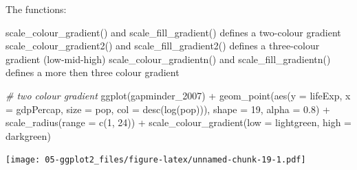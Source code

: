 \documentclass[
]{book}
\newenvironment{Shaded}{\begin{snugshade}}{\end{snugshade}}
\newcommand{\AttributeTok}[1]{\textcolor[rgb]{0.77,0.63,0.00}{#1}}
\newcommand{\CommentTok}[1]{\textcolor[rgb]{0.56,0.35,0.01}{\textit{#1}}}
\newcommand{\DecValTok}[1]{\textcolor[rgb]{0.00,0.00,0.81}{#1}}
\newcommand{\FloatTok}[1]{\textcolor[rgb]{0.00,0.00,0.81}{#1}}
\newcommand{\FunctionTok}[1]{\textcolor[rgb]{0.00,0.00,0.00}{#1}}
\newcommand{\NormalTok}[1]{#1}
\newcommand{\SpecialCharTok}[1]{\textcolor[rgb]{0.00,0.00,0.00}{#1}}
\newcommand{\StringTok}[1]{\textcolor[rgb]{0.31,0.60,0.02}{#1}}
\begin{document}
The functions:

scale\_colour\_gradient() and scale\_fill\_gradient() defines a two-colour gradient
scale\_colour\_gradient2() and scale\_fill\_gradient2() defines a three-colour gradient (low-mid-high)
scale\_colour\_gradientn() and scale\_fill\_gradientn() defines a more then three colour gradient

\begin{Shaded}
\begin{Highlighting}[]
\CommentTok{\# two colour gradient}
\FunctionTok{ggplot}\NormalTok{(gapminder\_2007) }\SpecialCharTok{+} 
  \FunctionTok{geom\_point}\NormalTok{(}\FunctionTok{aes}\NormalTok{(}\AttributeTok{y =}\NormalTok{ lifeExp, }\AttributeTok{x =}\NormalTok{ gdpPercap, }\AttributeTok{size =}\NormalTok{ pop, }\AttributeTok{col =} \FunctionTok{desc}\NormalTok{(}\FunctionTok{log}\NormalTok{(pop))), }
           \AttributeTok{shape =} \DecValTok{19}\NormalTok{, }\AttributeTok{alpha =} \FloatTok{0.8}\NormalTok{) }\SpecialCharTok{+}
  \FunctionTok{scale\_radius}\NormalTok{(}\AttributeTok{range =} \FunctionTok{c}\NormalTok{(}\DecValTok{1}\NormalTok{, }\DecValTok{24}\NormalTok{)) }\SpecialCharTok{+}
  \FunctionTok{scale\_colour\_gradient}\NormalTok{(}\AttributeTok{low =} \StringTok{\textquotesingle{}lightgreen\textquotesingle{}}\NormalTok{, }\AttributeTok{high =} \StringTok{\textquotesingle{}darkgreen\textquotesingle{}}\NormalTok{)}
\end{Highlighting}
\end{Shaded}

\texttt{[image: 05-ggplot2\_files/figure-latex/unnamed-chunk-19-1.pdf]}

\begin{Shaded}
\end{Shaded}
\end{document}
